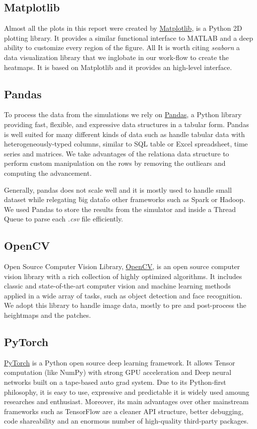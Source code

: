\documentclass[../document.tex]{subfiles}
\begin{document}
\subsection{Matplotlib}
Almost all the plots in this report were created by \href{https://matplotlib.org/}{Matplotlib}, is a Python 2D plotting library. It provides a similar functional interface to MATLAB and a deep ability to customize every region of the figure. All 
It is worth citing \emph{seaborn} a data visualization library that we inglobate in our work-flow to create the heatmaps. It is based on Matplotlib and it provides an high-level interface.
\subsection{Pandas}
To process the data from the simulations we rely on \href{https://pandas.pydata.org/}{Pandas}, a Python library providing fast, flexible, and expressive data structures in a tabular form. Pandas is well suited for many different kinds of data such as handle tabular data with heterogeneously-typed columns, similar to SQL table or Excel spreadsheet, time series and matrices. We take advantages of the relationa data structure to perform custom manipulation on the rows by removing the outliears and computing the advancement.

Generally, pandas does not scale well and it is mostly used to handle small dataset while relegating \"big data\" to other frameworks such as Spark or Hadoop. We used Pandas to store the results from the simulator and inside a Thread Queue to parse each \emph{.csv} file efficiently. 

\subsection{OpenCV}
Open Source Computer Vision Library, \href{https://opencv.org/}{OpenCV}, is an open source computer vision library with a rich collection of highly optimized algorithms. It includes classic and state-of-the-art computer vision and machine learning methods applied in a wide array of tasks, such as object detection and face recognition. We adopt this library to handle image data, mostly to pre and post-process the heightmaps and the patches.
\subsection{PyTorch}
\href{https://pytorch.org/}{PyTorch} is a Python open source deep learning framework. It allows Tensor computation (like NumPy) with strong GPU acceleration and Deep neural networks built on a tape-based auto grad system. Due to its Python-first philosophy, it is easy to use, expressive and predictable it is widely used amoung researches and enthusiast. Moreover, its main advantages over other mainstream frameworks such as TensorFlow \cite{tensorflow} are a cleaner API structure, better debugging, code shareability and an enormous number of high-quality third-party packages.
\end{document}
